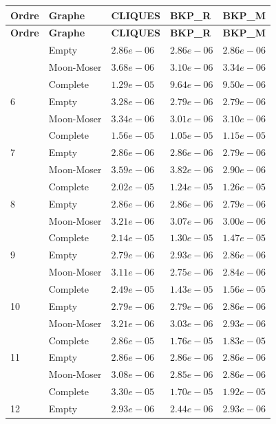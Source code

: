 \documentclass[12pt,a4paper]{article}
\begin{document}
\begin{longtable}{|l||l|l|l|l|}
  \hline
  \textbf{Ordre} & \textbf{Graphe} & \textbf{CLIQUES} & \textbf{BKP\_R} & \textbf{BKP\_M} \\
  \hline
  \endfirsthead
  \hline
  \textbf{Ordre} & \textbf{Graphe} & \textbf{CLIQUES} & \textbf{BKP\_R} & \textbf{BKP\_M} \\
  \hline
  \endhead
  \hline
  \endfoot
  \hline
  \endlastfoot
  5 & Empty & $2.86e-06$ & $2.86e-06$ & $2.86e-06$ \\
  & Moon-Moser & $3.68e-06$ & $3.10e-06$ & $3.34e-06$ \\
  & Complete & $1.29e-05$ & $9.64e-06$ & $9.50e-06$ \\
  \hline
  6 & Empty & $3.28e-06$ & $2.79e-06$ & $2.79e-06$ \\
  & Moon-Moser & $3.34e-06$ & $3.01e-06$ & $3.10e-06$ \\
  & Complete & $1.56e-05$ & $1.05e-05$ & $1.15e-05$ \\
  \hline
  7 & Empty & $2.86e-06$ & $2.86e-06$ & $2.79e-06$ \\
  & Moon-Moser & $3.59e-06$ & $3.82e-06$ & $2.90e-06$ \\
  & Complete & $2.02e-05$ & $1.24e-05$ & $1.26e-05$ \\
  \hline
  8 & Empty & $2.86e-06$ & $2.86e-06$ & $2.79e-06$ \\
  & Moon-Moser & $3.21e-06$ & $3.07e-06$ & $3.00e-06$ \\
  & Complete & $2.14e-05$ & $1.30e-05$ & $1.47e-05$ \\
  \hline
  9 & Empty & $2.79e-06$ & $2.93e-06$ & $2.86e-06$ \\
  & Moon-Moser & $3.11e-06$ & $2.75e-06$ & $2.84e-06$ \\
  & Complete & $2.49e-05$ & $1.43e-05$ & $1.56e-05$ \\
  \hline
  10 & Empty & $2.79e-06$ & $2.79e-06$ & $2.86e-06$ \\
  & Moon-Moser & $3.21e-06$ & $3.03e-06$ & $2.93e-06$ \\
  & Complete & $2.86e-05$ & $1.76e-05$ & $1.83e-05$ \\
  \hline
  11 & Empty & $2.86e-06$ & $2.86e-06$ & $2.86e-06$ \\
  & Moon-Moser & $3.08e-06$ & $2.85e-06$ & $2.86e-06$ \\
  & Complete & $3.30e-05$ & $1.70e-05$ & $1.92e-05$ \\
  \hline
  12 & Empty & $2.93e-06$ & $2.44e-06$ & $2.93e-06$ \\

\end{longtable}
\end{document}
